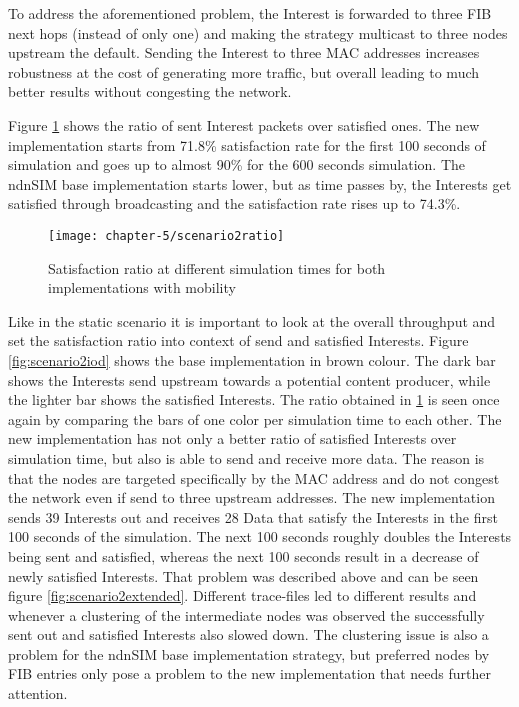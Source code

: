 To address the aforementioned problem, the Interest is forwarded to three FIB next hops (instead of only one) and making the strategy multicast to three nodes upstream the default. Sending the Interest to three MAC addresses increases robustness at the cost of generating more traffic, but overall leading to much better results without congesting the network.

Figure \ref{fig:scenario2ratio} shows the ratio of sent Interest packets over satisfied ones. The new implementation starts from 71.8\% satisfaction rate for the first 100 seconds of simulation and goes up to almost 90\% for the 600 seconds simulation. The ndnSIM base implementation starts lower, but as time passes by, the Interests get satisfied through broadcasting and the satisfaction rate rises up to 74.3\%.

\begin{figure}[H]
  \centering
  \texttt{[image: chapter-5/scenario2ratio]}
  \caption{Satisfaction ratio at different simulation times for both implementations with mobility}
  \label{fig:scenario2ratio}
\end{figure}

\vspace{5mm} %

Like in the static scenario it is important to look at the overall throughput and set the satisfaction ratio into context of send and satisfied Interests. Figure \ref{fig:scenario2iod} shows the base implementation in brown colour. The dark bar shows the Interests send upstream towards a potential content producer, while the lighter bar shows the satisfied Interests. The ratio obtained in \ref{fig:scenario2ratio} is seen once again by comparing the bars of one color per simulation time to each other. The new implementation has not only a better ratio of satisfied Interests over simulation time, but also is able to send and receive more data. The reason is that the nodes are targeted specifically by the MAC address and do not congest the network even if send to three upstream addresses.
The new implementation sends 39 Interests out and receives 28 Data that satisfy the Interests in the first 100 seconds of the simulation. The next 100 seconds roughly doubles the Interests being sent and satisfied, whereas the next 100 seconds result in a decrease of newly satisfied Interests. That problem was described above and can be seen figure \ref{fig:scenario2extended}. Different trace-files led to different results and whenever a clustering of the intermediate nodes was observed the successfully sent out and satisfied Interests also slowed down. The clustering issue is also a problem for the ndnSIM base implementation strategy, but preferred nodes by FIB entries only pose a problem to the new implementation that needs further attention.

